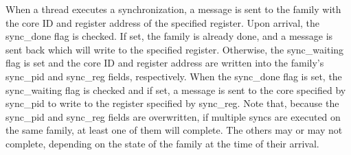When a thread executes a synchronization, a message is sent to the family with the core ID and register address of the specified register. Upon arrival, the sync\_done flag is checked. If set, the family is already done, and a message is sent back which will write to the specified register. Otherwise, the sync\_waiting flag is set and the core ID and register address are written into the family's sync\_pid and sync\_reg fields, respectively. When the sync\_done flag is set, the sync\_waiting flag is checked and if set, a message is sent to the core specified by sync\_pid to write to the register specified by sync\_reg. Note that, because the sync\_pid and sync\_reg fields are overwritten, if multiple syncs are executed on the same family, at least one of them will complete. The others may or may not complete, depending on the state of the family at the time of their arrival.